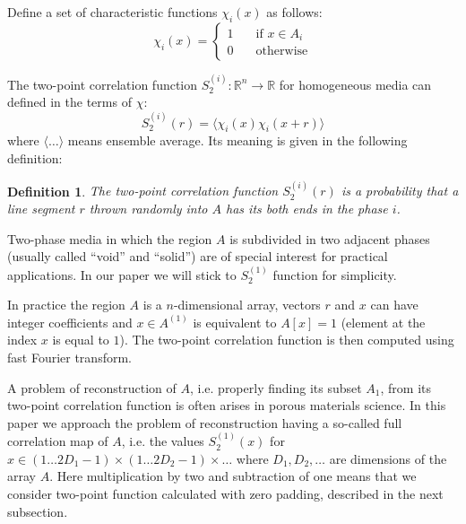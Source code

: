 \documentclass[12pt, a4paper]{article}
\newtheorem{definition}{Definition}
\begin{document}
Define a set of characteristic functions $\chi_i(x)$ as follows:
\begin{equation*}
  \chi_i(x) = \left\{
  \begin{array}{ll}
    1 & \quad \text{if $x \in A_i$} \\
    0 & \quad \text{otherwise}
  \end{array}
  \right.
\end{equation*}

The two-point correlation function
$S_2^{(i)}: \mathbb{R}^n \rightarrow \mathbb{R}$ for homogeneous media can
defined in the terms of $\chi$:
\begin{equation}
  S_2^{(i)}(r) = \langle \chi_i(x) \chi_i(x+r) \rangle
  \label{eq:s2}
\end{equation}
where $\langle \dots \rangle$ means ensemble average. Its meaning is given in
the following definition:
\begin{definition}
  The two-point correlation function $S_2^{(i)}(r)$ is a probability that a
  line segment $r$ thrown randomly into $A$ has its both ends in the phase $i$.
  \label{def:s2}
\end{definition}

Two-phase media in which the region $A$ is subdivided in two adjacent phases
(usually called ``void'' and ``solid'') are of special interest for practical
applications. In our paper we will stick to $S_2^{(1)}$ function for simplicity.

In practice the region $A$ is a $n$-dimensional array, vectors $r$ and $x$ can
have integer coefficients and $x \in A^{(1)}$ is equivalent to $A[x] = 1$
(element at the index $x$ is equal to $1$). The two-point correlation function
is then computed using fast Fourier transform.

A problem of reconstruction of $A$, i.e. properly finding its subset $A_1$, from
its two-point correlation function is often arises in porous materials
science. In this paper we approach the problem of reconstruction having a
so-called full correlation map of $A$, i.e. the values $S_2^{(1)}(x)$ for
$x \in (1 \dots 2D_1-1)\times(1 \dots 2D_2-1)\times\dots$ where
$D_1, D_2, \dots$ are dimensions of the array $A$. Here multiplication by two
and subtraction of one means that we consider two-point function calculated with
zero padding, described in the next subsection.
\end{document}
